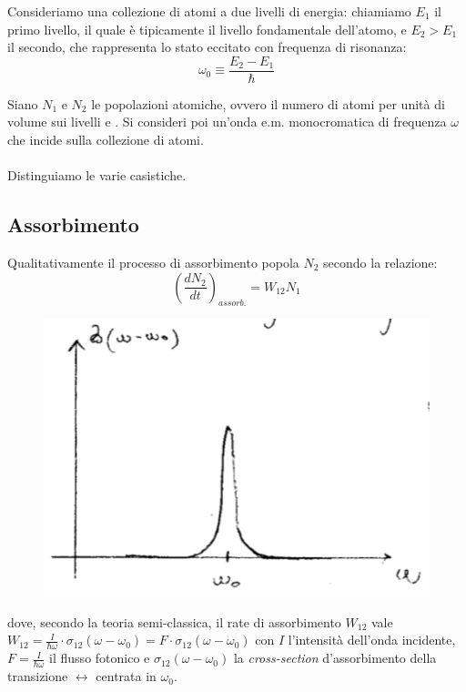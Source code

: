 Consideriamo una collezione di atomi a due livelli di energia:  chiamiamo $E_1$ il primo livello, il quale è tipicamente il livello fondamentale dell'atomo, e $E_2 > E_1$ il secondo, che rappresenta lo stato eccitato con frequenza di risonanza:
\begin{equation*}
    \omega_0 \equiv \frac{E_2 - E_1}{\hbar}
\end{equation*}

Siano $N_1$ e $N_2$ le popolazioni atomiche, ovvero il numero di atomi per unità di volume sui livelli  e . Si consideri poi un'onda e.m. monocromatica di frequenza $\omega$ che incide sulla collezione di atomi.\\
\\
Distinguiamo le varie casistiche.

\subsection{Assorbimento}

Qualitativamente il processo di assorbimento popola $N_2$ secondo la relazione:
\begin{equation*}
    \left( \frac{dN_2}{dt} \right)_{assorb.} = W_{12} N_1
\end{equation*}

\begin{figure}
    \centering
    \includegraphics[width=0.9\linewidth]{deltad}
\end{figure}

dove, secondo la teoria semi-classica, il rate di assorbimento $W_{12}$ vale $W_{12} = \frac{I}{\hbar\omega} \cdot \sigma_{12}(\omega - \omega_0) = F \cdot \sigma_{12}(\omega - \omega_0)$ con $I$ l'intensità dell'onda incidente, $F = \frac{I}{\hbar\omega}$ il flusso fotonico e $\sigma_{12}(\omega -\omega_0)$ la \textit{cross-section} d'assorbimento della transizione  $\leftrightarrow$  centrata in $\omega_0$.

